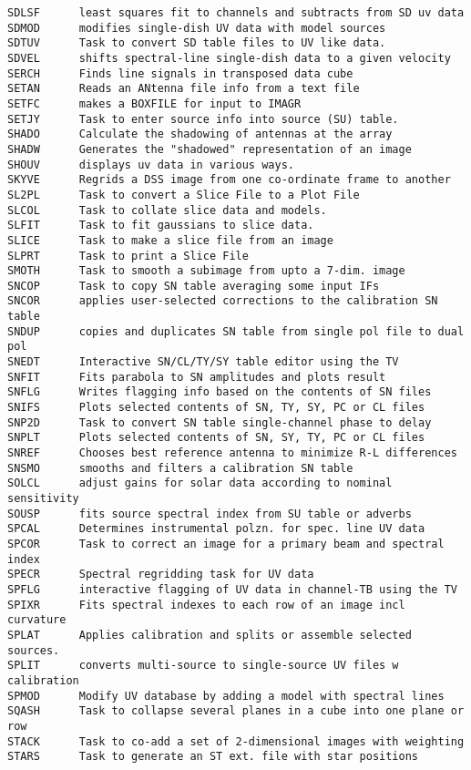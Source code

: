\begin{verbatim}
SDLSF      least squares fit to channels and subtracts from SD uv data
SDMOD      modifies single-dish UV data with model sources
SDTUV      Task to convert SD table files to UV like data.
SDVEL      shifts spectral-line single-dish data to a given velocity
SERCH      Finds line signals in transposed data cube
SETAN      Reads an ANtenna file info from a text file
SETFC      makes a BOXFILE for input to IMAGR
SETJY      Task to enter source info into source (SU) table.
SHADO      Calculate the shadowing of antennas at the array
SHADW      Generates the "shadowed" representation of an image
SHOUV      displays uv data in various ways.
SKYVE      Regrids a DSS image from one co-ordinate frame to another
SL2PL      Task to convert a Slice File to a Plot File
SLCOL      Task to collate slice data and models.
SLFIT      Task to fit gaussians to slice data.
SLICE      Task to make a slice file from an image
SLPRT      Task to print a Slice File
SMOTH      Task to smooth a subimage from upto a 7-dim. image
SNCOP      Task to copy SN table averaging some input IFs
SNCOR      applies user-selected corrections to the calibration SN table
SNDUP      copies and duplicates SN table from single pol file to dual pol
SNEDT      Interactive SN/CL/TY/SY table editor using the TV
SNFIT      Fits parabola to SN amplitudes and plots result
SNFLG      Writes flagging info based on the contents of SN files
SNIFS      Plots selected contents of SN, TY, SY, PC or CL files
SNP2D      Task to convert SN table single-channel phase to delay
SNPLT      Plots selected contents of SN, SY, TY, PC or CL files
SNREF      Chooses best reference antenna to minimize R-L differences
SNSMO      smooths and filters a calibration SN table
SOLCL      adjust gains for solar data according to nominal sensitivity
SOUSP      fits source spectral index from SU table or adverbs
SPCAL      Determines instrumental polzn. for spec. line UV data
SPCOR      Task to correct an image for a primary beam and spectral index
SPECR      Spectral regridding task for UV data
SPFLG      interactive flagging of UV data in channel-TB using the TV
SPIXR      Fits spectral indexes to each row of an image incl curvature
SPLAT      Applies calibration and splits or assemble selected sources.
SPLIT      converts multi-source to single-source UV files w calibration
SPMOD      Modify UV database by adding a model with spectral lines
SQASH      Task to collapse several planes in a cube into one plane or row
STACK      Task to co-add a set of 2-dimensional images with weighting
STARS      Task to generate an ST ext. file with star positions

\end{verbatim}
